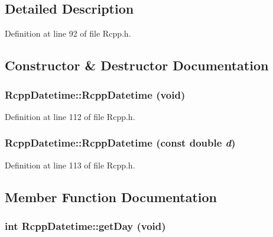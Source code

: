 \subsection{Detailed Description}


Definition at line 92 of file Rcpp.h.

\subsection{Constructor \& Destructor Documentation}
\hypertarget{classRcppDatetime_a5a1679444e775781bf038553ef3b04ae}{
\subsubsection[{RcppDatetime}]{\setlength{\rightskip}{0pt plus 5cm}RcppDatetime::RcppDatetime (void)}}
\label{classRcppDatetime_a5a1679444e775781bf038553ef3b04ae}


Definition at line 112 of file Rcpp.h.\hypertarget{classRcppDatetime_a43972d46cd15e6cb666d61f13bdc31f2}{
\subsubsection[{RcppDatetime}]{\setlength{\rightskip}{0pt plus 5cm}RcppDatetime::RcppDatetime (const double {\em d})}}
\label{classRcppDatetime_a43972d46cd15e6cb666d61f13bdc31f2}


Definition at line 113 of file Rcpp.h.

\subsection{Member Function Documentation}
\hypertarget{classRcppDatetime_a23e9f09bef162e1ffef0e43f8a446b77}{
\subsubsection[{getDay}]{\setlength{\rightskip}{0pt plus 5cm}int RcppDatetime::getDay (void)}}
\label{classRcppDatetime_a23e9f09bef162e1ffef0e43f8a446b77}


